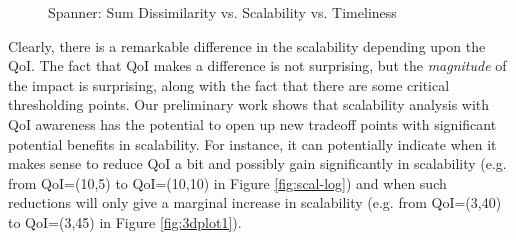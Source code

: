 \begin{figure}
   \caption{Spanner:  Sum Dissimilarity vs. Scalability vs. Timeliness}
\end{figure}

Clearly, there is a remarkable difference in the scalability depending upon
the QoI. %
The fact that QoI makes a difference is not surprising, but the {\em magnitude} of the
impact is surprising, along with the fact that there are some critical
thresholding points. Our preliminary work shows that
scalability analysis with QoI awareness has the potential to
open up new tradeoff points with
significant potential benefits in scalability. For instance, it can
potentially indicate when it makes sense to reduce QoI a bit and possibly
gain significantly in scalability (e.g. from QoI=(10,5) to QoI=(10,10) in Figure
\ref{fig:scal-log}) and when such reductions will only give a marginal
increase in scalability
(e.g. from QoI=(3,40) to QoI=(3,45) in Figure \ref{fig:3dplot1}).



